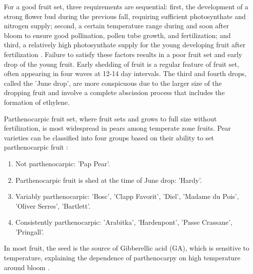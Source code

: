 \vspace{0.5em}
For a good fruit set, three requirements are sequential: first, the development of a strong flower bud during the previous fall, requiring sufficient photosynthate and nitrogen supply; second, a certain temperature range during and soon after bloom to ensure good pollination, pollen tube growth, and fertilization; and third, a relatively high photosynthate supply for the young developing fruit after fertilization \cite*{rmb_01_physiology_temperate_zone_fruit_trees}. Failure to satisfy these factors results in a poor fruit set and early drop of the young fruit. Early shedding of fruit is a regular feature of fruit set, often appearing in four waves at 12-14 day intervals. The third and fourth drops, called the 'June drop', are more conspicuous due to the larger size of the dropping fruit and involve a complete abscission process that includes the formation of ethylene.

\vspace{0.5em}
Parthenocarpic fruit set, where fruit sets and grows to full size without fertilization, is most widespread in pears among temperate zone fruits. Pear varieties can be classified into four groups based on their ability to set parthenocarpic fruit \cite*{rmb_01_physiology_temperate_zone_fruit_trees}: 

\begin{enumerate} 
    \item Not parthenocarpic: 'Pap Pear'. 
    \item Parthenocarpic fruit is shed at the time of June drop: 'Hardy'. 
    \item Variably parthenocarpic: 'Bosc', 'Clapp Favorit', 'Diel', 'Madame du Pois', 'Oliver Serres', 'Bartlett'. 
    \item Consistently parthenocarpic: 'Arabitka', 'Hardenpont', 'Passe Crassane', 'Pringall'. 
\end{enumerate} 

\vspace{0.5em}
In most fruit, the seed is the source of Gibberellic acid (GA), which is sensitive to temperature, explaining the dependence of parthenocarpy on high temperature around bloom \cite*{rmb_01_physiology_temperate_zone_fruit_trees}.



